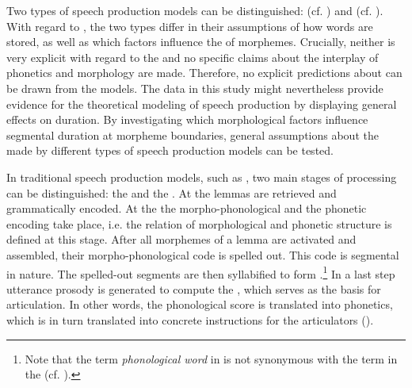 {{ Two types of  speech production models can be distinguished:  (cf. \citealt{Levelt.1999,Levelt.1999b,Levelt.2000}) and  (cf. \citealt{Johnson.1997b,Bybee.2002,Pierrehumbert.2001,Pierrehumbert.2002}). With regard to , the two types differ in their assumptions of how words are stored, as well as which factors influence the  of morphemes. Crucially, neither is very explicit with regard to the  and no specific claims about the interplay of phonetics and morphology are made. Therefore, no explicit predictions about  can be drawn from the models. The data in this study might nevertheless provide evidence for the theoretical modeling of  speech production by displaying general effects on duration. By investigating which morphological factors influence segmental duration at morpheme boundaries, general assumptions about the  made by different types of speech production models can be tested.

In traditional speech production models, such as  \cite{Levelt.1999b}, two main stages of processing can be distinguished: the  and the . At the  lemmas are retrieved and grammatically encoded. At the  the morpho-phonological and the phonetic encoding take place, i.e. the relation of morphological and phonetic structure is defined at this stage. After all morphemes of a lemma are activated and assembled, their morpho-phonological code is spelled out. This code is segmental in nature. The spelled-out segments are then syllabified to form .\footnote{Note that the term \textit{phonological word} in \cite{Levelt.1999b} is not synonymous with the term in the  (cf. ). } In a last step utterance prosody is generated to compute the , which serves as the basis for articulation. In other words, the phonological score is translated into phonetics, which is in turn translated into concrete instructions for the articulators ().

}}
